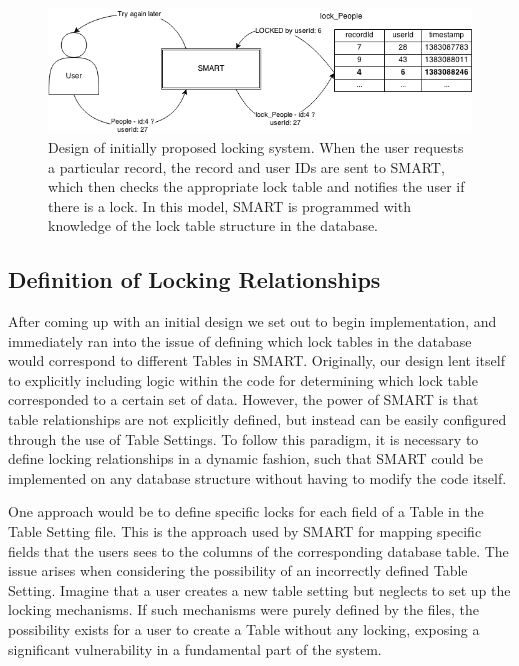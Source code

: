 \documentclass[12pt]{article}
\begin{document}
\begin{center}
\begin{figure}[h]
    \centering
    \centerline{\includegraphics[width=7in]{diagrams/InitialLockDesign.png}}
    \begin{spacing}{1.0}\caption{Design of initially proposed locking system. When the user requests a particular record, the record and user IDs are sent to SMART, which then checks the appropriate lock table and notifies the user if there is a lock. In this model, SMART is programmed with knowledge of the lock table structure in the database.}\end{spacing}
\end{figure}
\end{center}

\subsection{Definition of Locking Relationships}

After coming up with an initial design we set out to begin implementation, and immediately ran into the issue of defining which lock tables in the database would correspond to different Tables in SMART. Originally, our design lent itself to explicitly including logic within the code for determining which lock table corresponded to a certain set of data. However, the power of SMART is that table relationships are not explicitly defined, but instead can be easily configured through the use of Table Settings. To follow this paradigm, it is necessary to define locking relationships in a dynamic fashion, such that SMART could be implemented on any database structure without having to modify the code itself.

One approach would be to define specific locks for each field of a Table in the Table Setting file. This is the approach used by SMART for mapping specific fields that the users sees to the columns of the corresponding database table. The issue arises when considering the possibility of an incorrectly defined Table Setting. Imagine that a user creates a new table setting but neglects to set up the locking mechanisms. If such mechanisms were purely defined by the files, the possibility exists for a user to create a Table without any locking, exposing a significant vulnerability in a fundamental part of the system.
\end{document}
